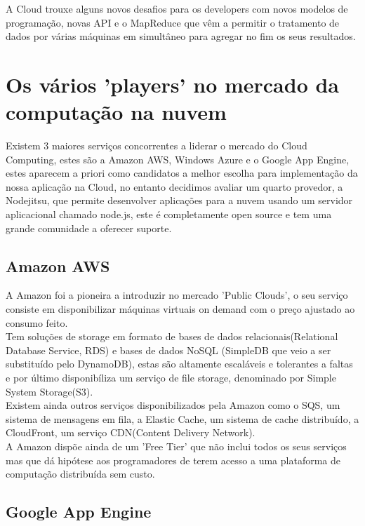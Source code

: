 A Cloud trouxe alguns novos desafios para os developers com novos modelos de programação, novas API e o MapReduce que vêm a permitir o tratamento de dados por várias máquinas em simultâneo para agregar no fim os seus resultados.


\section{Os vários 'players' no mercado da computação na nuvem}

Existem 3 maiores serviços concorrentes a liderar o mercado do Cloud Computing, estes são a Amazon AWS, Windows Azure e o Google App Engine, estes aparecem a priori como candidatos a melhor escolha para implementação da nossa aplicação na Cloud, no entanto decidimos avaliar um quarto provedor, a Nodejitsu, que permite desenvolver aplicações para a nuvem usando um servidor aplicacional chamado node.js, este é completamente open source e tem uma grande comunidade a oferecer suporte.
\\

\subsection{Amazon AWS}
A Amazon foi a pioneira a introduzir no mercado 'Public Clouds', o seu serviço consiste em disponibilizar máquinas virtuais on demand com o preço ajustado ao consumo feito. \\
Tem soluções de storage em formato de bases de dados relacionais(Relational Database Service, RDS) e bases de dados NoSQL (SimpleDB que veio a ser substituído pelo DynamoDB), estas são altamente escaláveis e tolerantes a faltas e por último disponibíliza um serviço de file storage, denominado por Simple System Storage(S3).\\
Existem ainda outros serviços disponibilizados pela Amazon como o SQS, um sistema de mensagens em fila, a Elastic Cache, um sistema de cache distribuído, a CloudFront, um serviço CDN(Content Delivery Network).\\
A Amazon dispõe ainda de um 'Free Tier' que não inclui todos os seus serviços mas que dá hipótese aos programadores de terem acesso a uma plataforma de computação distribuída sem custo.\\


\subsection{Google App Engine}

